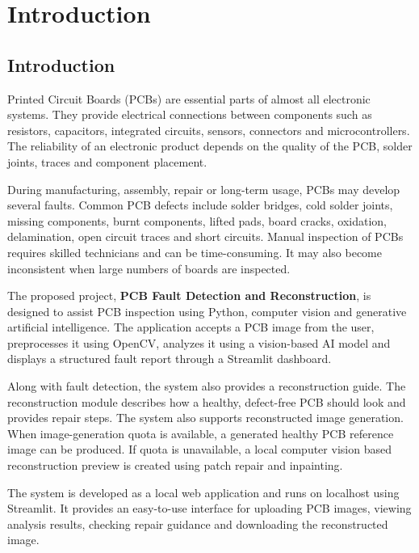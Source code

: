 \documentclass[12pt,a4paper]{report}
\begin{document}

\tableofcontents
\newpage


\chapter{Introduction}

\section{Introduction}

Printed Circuit Boards (PCBs) are essential parts of almost all electronic systems. They provide electrical connections between components such as resistors, capacitors, integrated circuits, sensors, connectors and microcontrollers. The reliability of an electronic product depends on the quality of the PCB, solder joints, traces and component placement.

During manufacturing, assembly, repair or long-term usage, PCBs may develop several faults. Common PCB defects include solder bridges, cold solder joints, missing components, burnt components, lifted pads, board cracks, oxidation, delamination, open circuit traces and short circuits. Manual inspection of PCBs requires skilled technicians and can be time-consuming. It may also become inconsistent when large numbers of boards are inspected.

The proposed project, \textbf{PCB Fault Detection and Reconstruction}, is designed to assist PCB inspection using Python, computer vision and generative artificial intelligence. The application accepts a PCB image from the user, preprocesses it using OpenCV, analyzes it using a vision-based AI model and displays a structured fault report through a Streamlit dashboard.

Along with fault detection, the system also provides a reconstruction guide. The reconstruction module describes how a healthy, defect-free PCB should look and provides repair steps. The system also supports reconstructed image generation. When image-generation quota is available, a generated healthy PCB reference image can be produced. If quota is unavailable, a local computer vision based reconstruction preview is created using patch repair and inpainting.

The system is developed as a local web application and runs on localhost using Streamlit. It provides an easy-to-use interface for uploading PCB images, viewing analysis results, checking repair guidance and downloading the reconstructed image.
\end{document}
